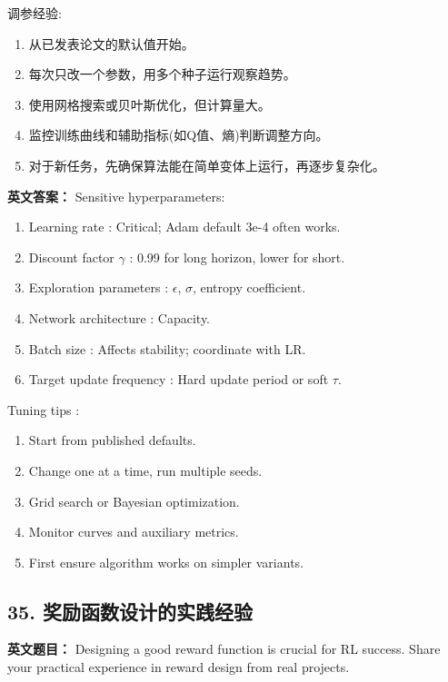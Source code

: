 \documentclass[10pt,a4paper]{ctexart}
\begin{document}
 调参经验:
\begin{enumerate}
    \item 从已发表论文的默认值开始。
    \item 每次只改一个参数，用多个种子运行观察趋势。
    \item 使用网格搜索或贝叶斯优化，但计算量大。
    \item 监控训练曲线和辅助指标(如Q值、熵)判断调整方向。
    \item 对于新任务，先确保算法能在简单变体上运行，再逐步复杂化。
\end{enumerate}

\textbf{英文答案：}  
Sensitive hyperparameters:
\begin{enumerate}
    \item Learning rate : Critical; Adam default 3e-4 often works.
    \item Discount factor \(\gamma\) : 0.99 for long horizon, lower for short.
    \item Exploration parameters : \(\epsilon\), \(\sigma\), entropy coefficient.
    \item Network architecture : Capacity.
    \item Batch size : Affects stability; coordinate with LR.
    \item Target update frequency : Hard update period or soft \(\tau\).
\end{enumerate}

 Tuning tips :
\begin{enumerate}
    \item Start from published defaults.
    \item Change one at a time, run multiple seeds.
    \item Grid search or Bayesian optimization.
    \item Monitor curves and auxiliary metrics.
    \item First ensure algorithm works on simpler variants.
\end{enumerate}

\subsection*{35. 奖励函数设计的实践经验}
\textbf{英文题目：} Designing a good reward function is crucial for RL success. Share your practical experience in reward design from real projects.
\end{document}
